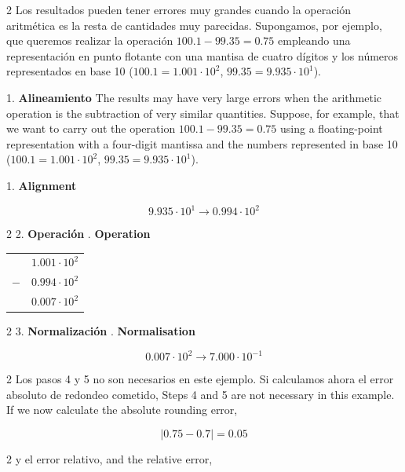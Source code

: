 \begin{paracol}{2}
Los resultados pueden tener errores muy grandes cuando la operación aritmética es la resta de cantidades muy parecidas. Supongamos, por ejemplo, que queremos realizar la operación $100.1-99.35=0.75$ empleando una representación en punto flotante con una mantisa de cuatro dígitos y los números representados en base 10 ($100.1=1.001\cdot10^2$, $99.35=9.935\cdot 10^1$).

 1. \textbf{Alineamiento}
 \switchcolumn
The results may have very large errors when the arithmetic operation is the subtraction of very similar quantities. Suppose, for example, that we want to carry out the operation $100.1-99.35=0.75$ using a floating-point representation with a four-digit mantissa and the numbers represented in base 10 ($100.1=1.001\cdot10^2$, $99.35=9.935\cdot 10^1$).

1. \textbf{Alignment}
\end{paracol}

\begin{equation*}
9.935\cdot 10^1\rightarrow 0.994 \cdot 10^2
\end{equation*}

\begin{paracol}{2}
2. \textbf{Operación}
. \textbf{Operation}
\end{paracol}
\begin{center}
\begin{tabular}{c r}
&$1.001\cdot10^2$\\
$-$&$0.994\cdot10^2$\\
\hline
&$0.007\cdot10^2$
\end{tabular}
\end{center}
\begin{paracol}{2}
3. \textbf{Normalización}
. \textbf{Normalisation}
\end{paracol}
\begin{equation*}
0.007\cdot10^2\rightarrow 7.000\cdot10^{-1}
\end{equation*}

\begin{paracol}{2}
Los pasos 4 y 5 no son necesarios en este ejemplo. Si calculamos ahora el error absoluto de redondeo cometido,
\switchcolumn
Steps 4 and 5 are not necessary in this example. If we now calculate the absolute rounding error,
\end{paracol}
\begin{equation*}
\vert 0.75-0.7 \vert =0.05
\end{equation*}
\begin{paracol}{2}
y el error relativo,
\switchcolumn
and the relative error,
\end{paracol}

